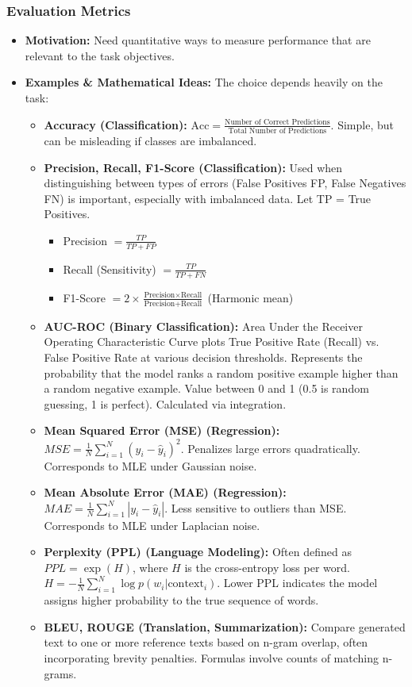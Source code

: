 \documentclass{article}
\begin{document}
\subsubsection{Evaluation Metrics}
\begin{itemize}
    \item \textbf{Motivation:} Need quantitative ways to measure performance that are relevant to the task objectives.
    \item \textbf{Examples \& Mathematical Ideas:} The choice depends heavily on the task:
        \begin{itemize}
            \item \textbf{Accuracy (Classification):} $\text{Acc} = \frac{\text{Number of Correct Predictions}}{\text{Total Number of Predictions}}$. Simple, but can be misleading if classes are imbalanced.
            \item \textbf{Precision, Recall, F1-Score (Classification):} Used when distinguishing between types of errors (False Positives FP, False Negatives FN) is important, especially with imbalanced data. Let TP = True Positives.
                \begin{itemize}
                    \item Precision $= \frac{TP}{TP + FP}$
                    \item Recall (Sensitivity) $= \frac{TP}{TP + FN}$
                    \item F1-Score $= 2 \times \frac{\text{Precision} \times \text{Recall}}{\text{Precision} + \text{Recall}}$ (Harmonic mean)
                \end{itemize}
            \item \textbf{AUC-ROC (Binary Classification):} Area Under the Receiver Operating Characteristic Curve plots True Positive Rate (Recall) vs. False Positive Rate at various decision thresholds. Represents the probability that the model ranks a random positive example higher than a random negative example. Value between 0 and 1 (0.5 is random guessing, 1 is perfect). Calculated via integration.
            \item \textbf{Mean Squared Error (MSE) (Regression):} $MSE = \frac{1}{N} \sum_{i=1}^N (y_i - \hat{y}_i)^2$. Penalizes large errors quadratically. Corresponds to MLE under Gaussian noise.
            \item \textbf{Mean Absolute Error (MAE) (Regression):} $MAE = \frac{1}{N} \sum_{i=1}^N |y_i - \hat{y}_i|$. Less sensitive to outliers than MSE. Corresponds to MLE under Laplacian noise.
            \item \textbf{Perplexity (PPL) (Language Modeling):} Often defined as $PPL = \exp(H)$, where $H$ is the cross-entropy loss per word. $H = -\frac{1}{N} \sum_{i=1}^N \log p(w_i | \text{context}_i)$. Lower PPL indicates the model assigns higher probability to the true sequence of words.
            \item \textbf{BLEU, ROUGE (Translation, Summarization):} Compare generated text to one or more reference texts based on n-gram overlap, often incorporating brevity penalties. Formulas involve counts of matching n-grams.
        \end{itemize}
\end{itemize}
\end{document}
